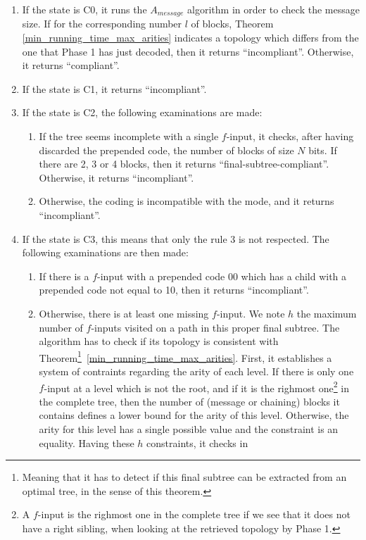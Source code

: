 \documentclass{llncs}
\begin{document}
\begin{enumerate}
\item If the state is C0, it runs the $A_{message}$ algorithm in order to check the message size. If for the corresponding number $l$ of blocks, 
 Theorem \ref{min_running_time_max_arities} indicates a topology which differs from
 the one that Phase 1 has just decoded, then it returns ``incompliant''. Otherwise, it returns ``compliant''.

\item If the state is C1, it returns ``incompliant''.
 \item If the state is C2, the following examinations are made:
 \begin{enumerate}
  \item If the tree seems incomplete with a single $f$-input, it checks, after having discarded the prepended code, the number of blocks of size $N$ bits.
  If there are 2, 3 or 4 blocks, then it returns ``final-subtree-compliant''. Otherwise, it returns ``incompliant''.
  \item Otherwise, the coding is incompatible with the mode, and it returns ``incompliant''.
 \end{enumerate}
 \item If the state is C3, this means that only the rule 3 is not respected. The following examinations are then made:
 \begin{enumerate}
  \item If there is a $f$-input with a prepended code 00 which has a child with a prepended code not equal to 10, then it returns ``incompliant''.
\item Otherwise, there is at least one missing $f$-input. We note $h$ the maximum number of $f$-inputs visited on a path in this proper final subtree. 
The algorithm has to check if its topology is consistent with Theorem\footnote{Meaning that it has to detect if this final subtree can be extracted 
  from an optimal tree, in the sense of this theorem.}~\ref{min_running_time_max_arities}. 
  First, it establishes a system of contraints regarding the arity of each level.  If there is only one $f$-input at a level which is not the root, 
  and if it is the righmost one\footnote{A $f$-input is the righmost one in the complete tree if we see that it does not have a right sibling, when looking at the 
  retrieved topology by Phase 1.} in the complete tree, then the number of (message or chaining) blocks it contains defines a lower bound for the arity 
  of this level. Otherwise, the arity for this level has a single possible value and the constraint is an equality. Having these $h$ constraints, it checks in 

\end{enumerate}
\end{enumerate}
\end{document}
